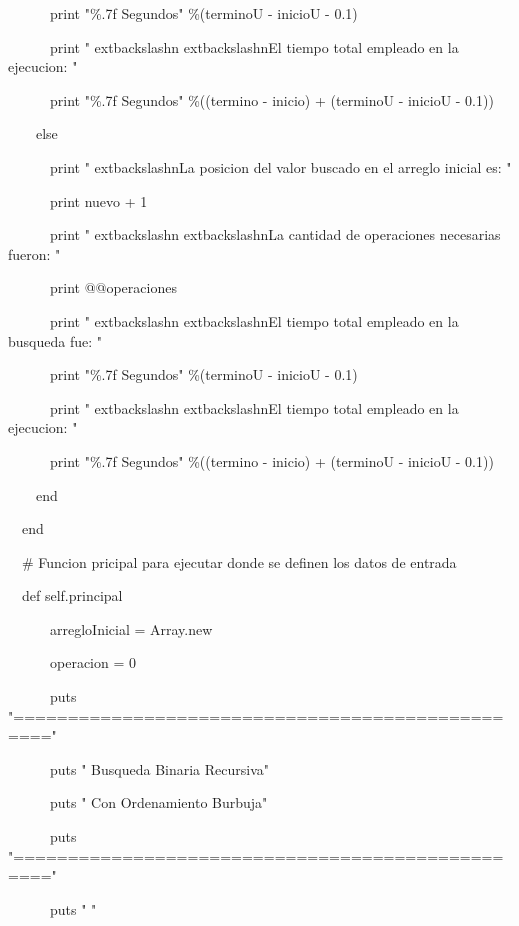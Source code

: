 {\noindent \ \ \ \ \ \       print  "\%.7f Segundos" \%(terminoU - inicioU - 0.1)

\noindent \ \ \ \ \ \       print "	extbackslashn	extbackslashnEl tiempo total empleado en la ejecucion: "    

\noindent \ \ \ \ \ \       print  "\%.7f Segundos" \%((termino - inicio) + (terminoU - inicioU - 0.1))   

\bigskip 
\noindent \ \ \ \     else

\noindent \ \ \ \ \ \       print "	extbackslashnLa posicion del valor buscado en el arreglo inicial es: "

\noindent \ \ \ \ \ \       print nuevo + 1

\noindent \ \ \ \ \ \       print "	extbackslashn	extbackslashnLa cantidad de operaciones necesarias fueron: "

\noindent \ \ \ \ \ \       print @@operaciones  

\noindent \ \ \ \ \ \       print "	extbackslashn	extbackslashnEl tiempo total empleado en la busqueda fue: "    

\noindent \ \ \ \ \ \       print  "\%.7f Segundos" \%(terminoU - inicioU - 0.1) 

\noindent \ \ \ \ \ \       print "	extbackslashn	extbackslashnEl tiempo total empleado en la ejecucion: "    

\noindent \ \ \ \ \ \       print  "\%.7f Segundos" \%((termino - inicio) + (terminoU - inicioU - 0.1))      

\noindent \ \ \ \     end

\noindent \ \   end

\bigskip 
\noindent \ \   \# Funcion pricipal para ejecutar donde se definen los datos de entrada

\noindent \ \   def self.principal

\noindent \ \ \ \ \ \       arregloInicial = Array.new

\noindent \ \ \ \ \ \       operacion = 0

\noindent \ \ \ \ \ \       puts "================================================="

\noindent \ \ \ \ \ \       puts "           Busqueda Binaria Recursiva"

\noindent \ \ \ \ \ \       puts "            Con Ordenamiento Burbuja"

\noindent \ \ \ \ \ \       puts "================================================="

\noindent \ \ \ \ \ \       puts " "

}
